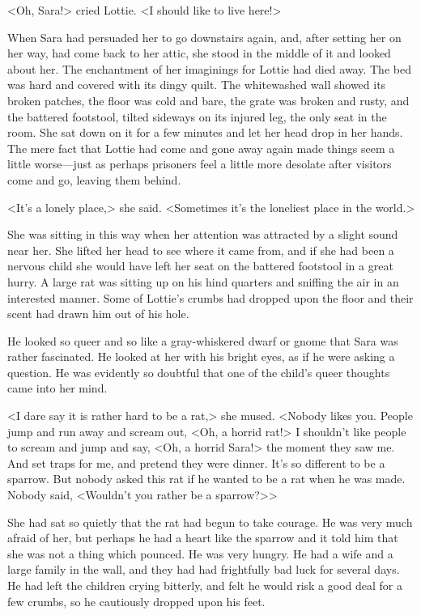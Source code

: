 <Oh, Sara!> cried Lottie. <I should like to live here!>

When Sara had persuaded her to go downstairs again, and, after setting her on her way, had come back to her attic, she stood in the middle of it and looked about her. The enchantment of her imaginings for Lottie had died away. The bed was hard and covered with its dingy quilt. The whitewashed wall showed its broken patches, the floor was cold and bare, the grate was broken and rusty, and the battered footstool, tilted sideways on its injured leg, the only seat in the room. She sat down on it for a few minutes and let her head drop in her hands. The mere fact that Lottie had come and gone away again made things seem a little worse—just as perhaps prisoners feel a little more desolate after visitors come and go, leaving them behind.

<It's a lonely place,> she said. <Sometimes it's the loneliest place in the world.>

She was sitting in this way when her attention was attracted by a slight sound near her. She lifted her head to see where it came from, and if she had been a nervous child she would have left her seat on the battered footstool in a great hurry. A large rat was sitting up on his hind quarters and sniffing the air in an interested manner. Some of Lottie's crumbs had dropped upon the floor and their scent had drawn him out of his hole.

He looked so queer and so like a gray-whiskered dwarf or gnome that Sara was rather fascinated. He looked at her with his bright eyes, as if he were asking a question. He was evidently so doubtful that one of the child's queer thoughts came into her mind.

<I dare say it is rather hard to be a rat,> she mused. <Nobody likes you. People jump and run away and scream out, <Oh, a horrid rat!> I shouldn't like people to scream and jump and say, <Oh, a horrid Sara!> the moment they saw me. And set traps for me, and pretend they were dinner. It's so different to be a sparrow. But nobody asked this rat if he wanted to be a rat when he was made. Nobody said, <Wouldn't you rather be a sparrow?>>

She had sat so quietly that the rat had begun to take courage. He was very much afraid of her, but perhaps he had a heart like the sparrow and it told him that she was not a thing which pounced. He was very hungry. He had a wife and a large family in the wall, and they had had frightfully bad luck for several days. He had left the children crying bitterly, and felt he would risk a good deal for a few crumbs, so he cautiously dropped upon his feet.

